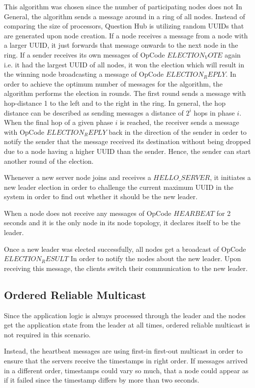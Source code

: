\documentclass[runningheads]{llncs}
\begin{document}
This algorithm was chosen since the number of participating nodes does not 
In General, the algorithm sends a message around in a ring of all nodes.
Instead of comparing the size of processors, Question Hub is utilizing
random UUIDs that are generated upon node creation. If a node receives a
message from a node with a larger UUID, it just forwards that message onwards
to the next node in the ring. If a sender receives its own messages of OpCode 
$ELECTION_VOTE$ again i.e. it had the largest UUID of all nodes, it won the
election which will result in the winning node broadcasting a message of
OpCode $ELECTION_REPLY$. In order to achieve the optimum number of messages
for the algorithm, the algorithm performs the election in rounds. The first
round sends a message with hop-distance 1 to the left and to the right in the
ring. In general, the hop distance can be described as sending messages a
distance of $2^i$ hops in phase $i$. When the final hop of a given phase $i$ is
reached, the receiver sends a message with OpCode $ELECTION_REPLY$ back in the
direction of the sender in order to notify the sender that the message received
its destination without being dropped due to a node having a higher UUID than
the sender. Hence, the sender can start another round of the election.

Whenever a new server node joins and receives a $HELLO\_SERVER$, it initiates a
new leader election in order to challenge the current maximum UUID in the
system in order to find out whether it should be the new leader.

When a node does not receive any messages of OpCode $HEARBEAT$ for 2 seconds
and it is the only node in its node topology, it declares itself to be the
leader.

Once a new leader was elected successfully, all nodes get a broadcast of
OpCode $ELECTION_RESULT$ In order to notify the nodes about the new leader.
Upon receiving this message, the clients switch their communication to the
new leader.

\subsection{Ordered Reliable Multicast}

Since the application logic is always processed through the leader and the
nodes get the application state from the leader at all times, ordered
reliable multicast is not required in this scenario.

Instead, the heartbeat messages are using first-in first-out multicast in order to ensure that the
servers receive the timestamps in right order. If messages arrived in a
different order, timestamps could vary so much, that a node could appear as if
it failed since the timestamp differs by more than two seconds. 
\end{document}
